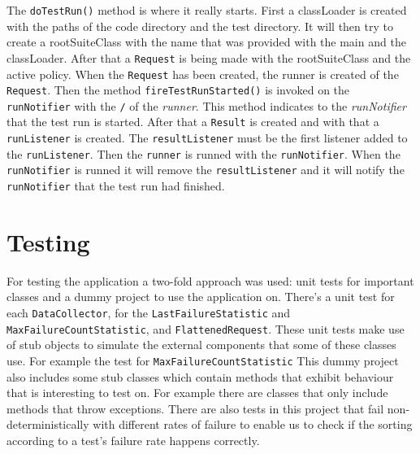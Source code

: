 \documentclass[i2]{oss}
\newcommand{\class}[1]{\texttt{#1}}
\newcommand{\method}[1]{\texttt{#1}}
\begin{document}
The \method{doTestRun()} method is where it really starts. First a classLoader is created with the paths of the code directory and the test directory. It will then try to create a rootSuiteClass with the name that was provided with the main and the classLoader.
After that a \class{Request} is being made with the rootSuiteClass and the active policy. When the \class{Request} has been created, the runner is created of the \class{Request}. Then the method \method{fireTestRunStarted()} is invoked on the \class{runNotifier} with the \class{/} of the \emph{runner}. This method indicates to the \emph{runNotifier} that the test run is started. 
After that a \class{Result} is created and with that a \class{runListener} is created.  The \class{resultListener} must be the first listener added to the \class{runListener}. Then the \class{runner} is runned with the \class{runNotifier}. When the \class{runNotifier} is runned it will remove the \class{resultListener} and it will notify the \class{runNotifier} that the test run had finished.



\section{Testing}
\label{ssec:testing}

For testing the application a two-fold approach was used: unit tests for
important classes and a dummy project to use the application on.
There's a unit test for each \class{DataCollector}, for the 
\class{LastFailureStatistic} and \class{MaxFailureCountStatistic}, and  \class{FlattenedRequest}.
These unit tests make use of stub objects to simulate the external 
components that some of these classes use.
For example the test for \class{MaxFailureCountStatistic} 
This dummy project also includes some stub classes which contain methods 
that exhibit behaviour that is interesting to test on.
For example there are classes that only include methods that throw 
exceptions.
There are also tests in this project that fail non-deterministically with 
different rates of failure to enable us to check if the sorting according 
to a test's failure rate happens correctly.



\end{document}
